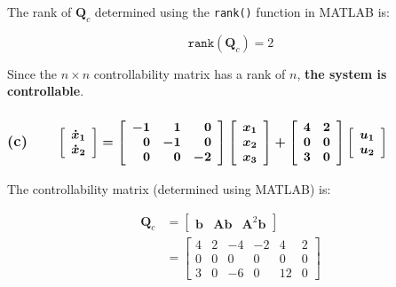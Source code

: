 \documentclass[12pt, letterpaper]{../assignment}
\begin{document}
The rank of $\textbf{Q}_c$ determined using the \texttt{rank()} function in MATLAB is:

$$ \texttt{rank}(\textbf{Q}_c ) = 2 $$

\begin{answer}
Since the $n \times n$ controllability matrix has a rank of $n$,
\textbf{the system is controllable}.
\end{answer}

\subsubsection*{(c) \ \ \ $\boldmath{
\left[\begin{array}{c} \dot{x}_1\\\dot{x}_2 \end{array}\right]
= \left[\begin{array}{rrr} -1 & 1 & 0 \\0 & -1 & 0 \\ 0 & 0 & -2 \end{array}\right]
\left[\begin{array}{c} x_1\\x_2\\ x_3 \end{array}\right]
+ \left[\begin{array}{rr} 4 & 2 \\ 0 & 0 \\ 3 & 0 \end{array}\right]
\left[\begin{array}{c} u_1\\u_2 \end{array}\right]  }$}

The controllability matrix (determined using MATLAB) is:

\begin{equation*}
\begin{aligned} 
\textbf{Q}_c &= \left[\begin{array}{ccc} \textbf{b} & \textbf{A}\textbf{b} & \textbf{A}^2\textbf{b} \end{array}\right]\\
                &= \left[\begin{array}{rrrrrr}
                    4 & 2 & -4 & -2 &  4 & 2 \\
                    0 & 0 &  0 &  0 &  0 & 0 \\
                    3 & 0 & -6 &  0 & 12 & 0
                \end{array}\right]
\end{aligned}   
\end{equation*}
\end{document}

